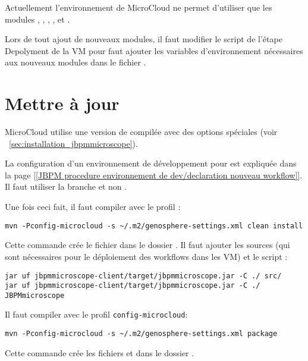 Actuellement l'environnement de MicroCloud ne permet d'utiliser que les modules , , , ,  et .

\begin{warningbox}
    Lors de tout ajout de nouveaux modules, il faut modifier le script de l'étape Depolyment de la VM 
    pour faut ajouter les variables d'environnement nécessaires aux nouveaux modules
    dans le fichier .
\end{warningbox}

\section{Mettre à jour } \label{sec:nouvelle_version_jbpmmicroscope}

MicroCloud utilise une version de  compilée avec des options spéciales (voir ~\autoref{sec:installation_jbpmmicroscope}).

La configuration d'un environnement de développement pour  est expliquée
dans la page \href{https://intranet.genoscope.cns.fr/agc/redmine/projects/microscopeworkflow/wiki/JBPMprocedure}{[[JBPM procedure environnement de dev/declaration nouveau workflow]]}.
Il faut utiliser la branche  et non .

Une fois ceci fait, il faut compiler  avec le profil :
\begin{lstlisting}[style=bash]
mvn -Pconfig-microcloud -s ~/.m2/genosphere-settings.xml clean install
\end{lstlisting}
Cette commande crée le fichier  dans le dossier .
Il faut ajouter les sources (qui sont nécessaires pour le déploiement des workflows dans les VM) et le script :
\begin{lstlisting}[style=bash]
jar uf jbpmmicroscope-client/target/jbpmmicroscope.jar -C ./ src/
jar uf jbpmmicroscope-client/target/jbpmmicroscope.jar -C ./ JBPMmicroscope
\end{lstlisting}

Il faut compiler  avec le profil \texttt{config-microcloud}:
\begin{lstlisting}[style=bash]
mvn -Pconfig-microcloud -s ~/.m2/genosphere-settings.xml package
\end{lstlisting}
Cette commande crée les fichiers  et 
dans le dossier .

